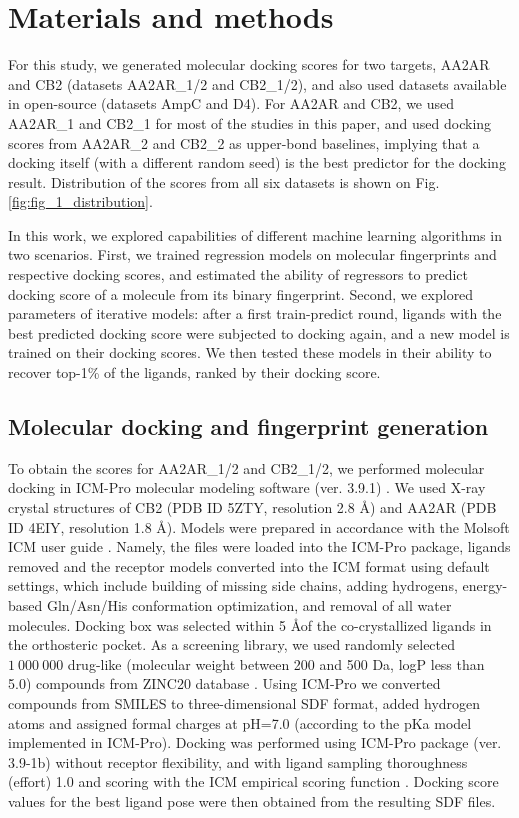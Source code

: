 \section{Materials and methods}
For this study, we generated molecular docking scores for two targets, AA2AR and CB2 (datasets AA2AR\_1/2 and CB2\_1/2), and also used datasets available in open-source \cite{ultralarge_docking_first} (datasets AmpC and D4). For AA2AR and CB2, we used AA2AR\_1 and CB2\_1 for most of the studies in this paper, and used docking scores from AA2AR\_2 and CB2\_2 as upper-bond baselines, implying that a docking itself (with a different random seed) is the best predictor for the docking result. Distribution of the scores from all six datasets is shown on Fig. \ref{fig:fig_1_distribution}.

In this work, we explored capabilities of different machine learning algorithms in two scenarios. First, we trained regression models on molecular fingerprints and respective docking scores, and estimated the ability of regressors to predict docking score of a molecule from its binary fingerprint. Second, we explored parameters of iterative models: after a first train-predict round, ligands with the best predicted docking score were subjected to docking again, and a new model is trained on their docking scores. We then tested these models in their ability to recover top-1\% of the ligands, ranked by their docking score.


\subsection{Molecular docking and fingerprint generation}
To obtain the scores for AA2AR\_1/2 and CB2\_1/2, we performed molecular docking in ICM-Pro molecular modeling software (ver. 3.9.1) \cite{molsoft_guide}. We used X-ray crystal structures of CB2 (PDB ID 5ZTY, resolution 2.8 \AA) and AA2AR (PDB ID 4EIY, resolution 1.8 \AA). Models were prepared in accordance with the Molsoft ICM user guide \cite{molsoft_guide}. Namely, the files were loaded into the ICM-Pro package, ligands removed and the receptor models converted into the ICM format using default settings, which include building of missing side chains, adding hydrogens, energy-based Gln/Asn/His conformation optimization, and removal of all water molecules. Docking box was selected within 5 \AA of the co-crystallized ligands in the orthosteric pocket. As a screening library, we used randomly selected $1\ 000\ 000$ drug-like (molecular weight between 200 and 500 Da, logP less than 5.0) compounds from ZINC20 database \cite{Irwin2020ZINC20Discovery}. Using ICM-Pro we converted compounds from SMILES to three-dimensional SDF  format, added hydrogen atoms and assigned formal charges at pH=7.0 (according to the pKa model implemented in ICM-Pro). Docking was performed using ICM-Pro package (ver. 3.9-1b) without receptor flexibility, and with ligand sampling thoroughness (effort) 1.0 and scoring with the ICM empirical scoring function \cite{abagyan_biased_1994}. Docking score values for the best ligand pose were then obtained from the resulting SDF files.



